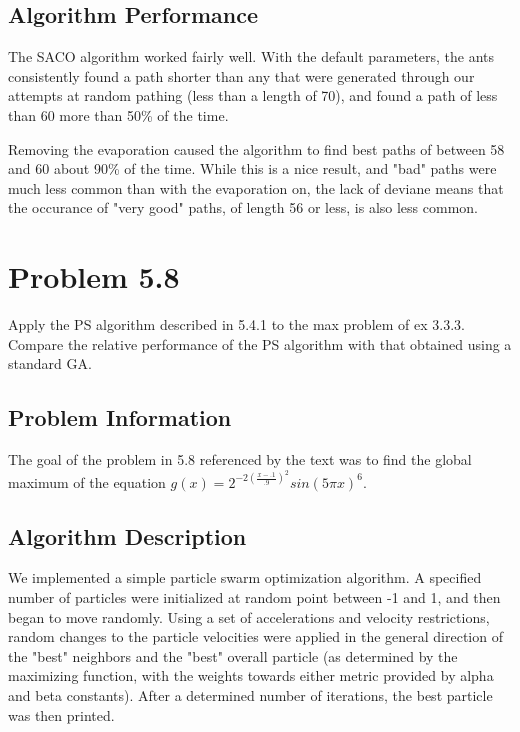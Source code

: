 \subsection{Algorithm Performance}

The SACO algorithm worked fairly well.  With the default parameters, the ants consistently found a path shorter than any that were generated through our attempts at random pathing (less than a length of 70), and found a path of less than 60 more than 50\% of the time.


Removing the evaporation caused the algorithm to find best paths of between 58 and 60 about 90\% of the time.  While this is a nice result, and "bad" paths were much less common than with the evaporation on, the lack of deviane means that the occurance of "very good" paths, of length 56 or less, is also less common. 

\section{Problem 5.8}

Apply the PS algorithm described in 5.4.1 to the max problem of ex 3.3.3. Compare the relative performance of the PS algorithm with that obtained using a standard GA.

\subsection{Problem Information}

The goal of the problem in 5.8 referenced by the text was to find the global maximum of the equation $g(x) = 2^{-2(\frac{x-.1}{.9})^2}sin(5\pi x)^6$.

\subsection{Algorithm Description}

We implemented a simple particle swarm optimization algorithm.  A specified number of particles were initialized at random point between -1 and 1, and then began to move randomly.  Using a set of accelerations and velocity restrictions, random changes to the particle velocities were applied in the general direction of the "best" neighbors and the "best" overall particle (as determined by the maximizing function, with the weights towards either metric provided by alpha and beta constants).  After a determined number of iterations, the best particle was then printed.

